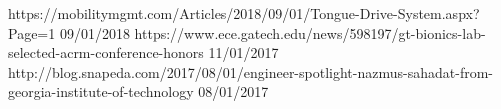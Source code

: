 \begin{news}
\cvnews
    {https://mobilitymgmt.com/Articles/2018/09/01/Tongue-Drive-System.aspx?Page=1}
    {09/01/2018}
\cvnews
    {https://www.ece.gatech.edu/news/598197/gt-bionics-lab-selected-acrm-conference-honors}
    {11/01/2017}
\cvnews
    {http://blog.snapeda.com/2017/08/01/engineer-spotlight-nazmus-sahadat-from-georgia-institute-of-technology}
    {08/01/2017}
\end{news}
